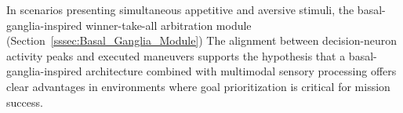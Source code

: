 

In scenarios presenting simultaneous appetitive and aversive stimuli, the basal-ganglia-inspired
winner-take-all arbitration module (Section~\ref{sssec:Basal_Ganglia_Module})  The alignment between decision-neuron activity peaks
and executed maneuvers supports the hypothesis that a basal-ganglia-inspired architecture combined
with multimodal sensory processing offers clear advantages in environments where goal
prioritization is critical for mission success.


